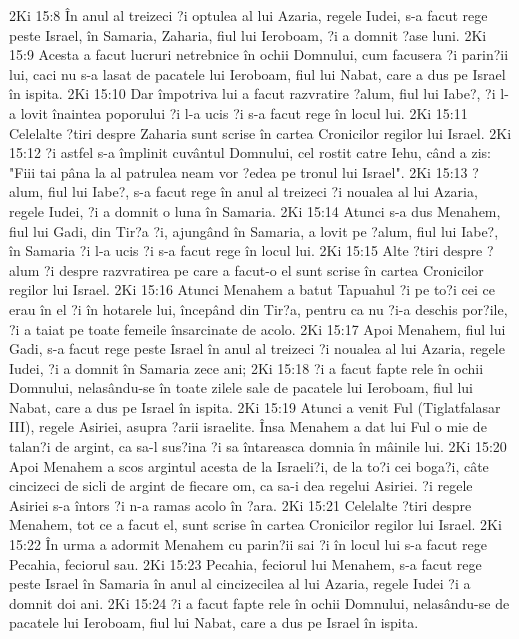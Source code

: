 2Ki 15:8  În anul al treizeci ?i optulea al lui Azaria, regele Iudei, s-a facut rege peste Israel, în Samaria, Zaharia, fiul lui Ieroboam, ?i a domnit ?ase luni.
2Ki 15:9  Acesta a facut lucruri netrebnice în ochii Domnului, cum facusera ?i parin?ii lui, caci nu s-a lasat de pacatele lui Ieroboam, fiul lui Nabat, care a dus pe Israel în ispita.
2Ki 15:10  Dar împotriva lui a facut razvratire ?alum, fiul lui Iabe?, ?i l-a lovit înaintea poporului ?i l-a ucis ?i s-a facut rege în locul lui.
2Ki 15:11  Celelalte ?tiri despre Zaharia sunt scrise în cartea Cronicilor regilor lui Israel.
2Ki 15:12  ?i astfel s-a împlinit cuvântul Domnului, cel rostit catre Iehu, când a zis: "Fiii tai pâna la al patrulea neam vor ?edea pe tronul lui Israel".
2Ki 15:13  ?alum, fiul lui Iabe?, s-a facut rege în anul al treizeci ?i noualea al lui Azaria, regele Iudei, ?i a domnit o luna în Samaria.
2Ki 15:14  Atunci s-a dus Menahem, fiul lui Gadi, din Tir?a ?i, ajungând în Samaria, a lovit pe ?alum, fiul lui Iabe?, în Samaria ?i l-a ucis ?i s-a facut rege în locul lui.
2Ki 15:15  Alte ?tiri despre ?alum ?i despre razvratirea pe care a facut-o el sunt scrise în cartea Cronicilor regilor lui Israel.
2Ki 15:16  Atunci Menahem a batut Tapuahul ?i pe to?i cei ce erau în el ?i în hotarele lui, începând din Tir?a, pentru ca nu ?i-a deschis por?ile, ?i a taiat pe toate femeile însarcinate de acolo.
2Ki 15:17  Apoi Menahem, fiul lui Gadi, s-a facut rege peste Israel în anul al treizeci ?i noualea al lui Azaria, regele Iudei, ?i a domnit în Samaria zece ani;
2Ki 15:18  ?i a facut fapte rele în ochii Domnului, nelasându-se în toate zilele sale de pacatele lui Ieroboam, fiul lui Nabat, care a dus pe Israel în ispita.
2Ki 15:19  Atunci a venit Ful (Tiglatfalasar III), regele Asiriei, asupra ?arii israelite. Însa Menahem a dat lui Ful o mie de talan?i de argint, ca sa-l sus?ina ?i sa întareasca domnia în mâinile lui.
2Ki 15:20  Apoi Menahem a scos argintul acesta de la Israeli?i, de la to?i cei boga?i, câte cincizeci de sicli de argint de fiecare om, ca sa-i dea regelui Asiriei. ?i regele Asiriei s-a întors ?i n-a ramas acolo în ?ara.
2Ki 15:21  Celelalte ?tiri despre Menahem, tot ce a facut el, sunt scrise în cartea Cronicilor regilor lui Israel.
2Ki 15:22  În urma a adormit Menahem cu parin?ii sai ?i în locul lui s-a facut rege Pecahia, feciorul sau.
2Ki 15:23  Pecahia, feciorul lui Menahem, s-a facut rege peste Israel în Samaria în anul al cincizecilea al lui Azaria, regele Iudei ?i a domnit doi ani.
2Ki 15:24  ?i a facut fapte rele în ochii Domnului, nelasându-se de pacatele lui Ieroboam, fiul lui Nabat, care a dus pe Israel în ispita.
